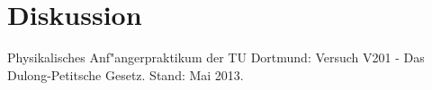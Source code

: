 \section{Diskussion}
\label{diskussion}

\begin{thebibliography}{9}
	 Physikalisches Anf"angerpraktikum der TU Dortmund: Versuch V201 - Das Dulong-Petitsche Gesetz. Stand: Mai 2013.
\end{thebibliography}

